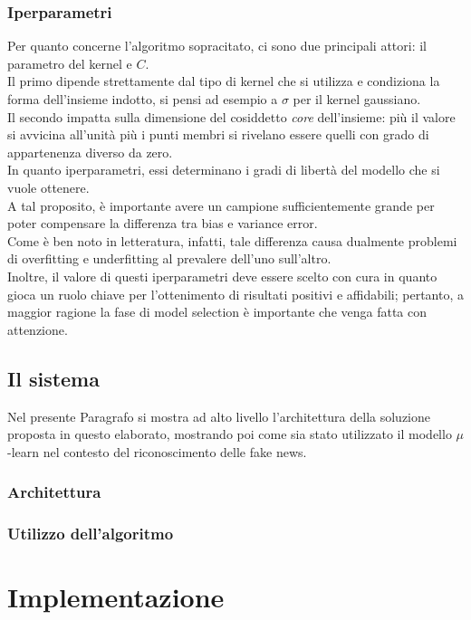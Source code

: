 \documentclass[12pt]{report}
\theoremstyle{definition}
\begin{document}
\subsection{Iperparametri}
Per quanto concerne l'algoritmo sopracitato, ci sono due principali attori: il parametro del kernel e $C$.
\\
Il primo dipende strettamente dal tipo di kernel che si utilizza e condiziona la forma dell'insieme indotto, si pensi ad esempio a $\sigma$ per il kernel gaussiano.
\\
Il secondo impatta sulla dimensione del cosiddetto \textit{core} dell'insieme: più il valore si avvicina all'unità più i punti membri si rivelano essere quelli con grado di appartenenza diverso da zero.
\\
In quanto iperparametri, essi determinano i gradi di libertà del modello che si vuole ottenere.
\\
A tal proposito, è importante avere un campione sufficientemente grande per poter compensare la differenza tra bias e variance error.
\\
Come è ben noto in letteratura, infatti, tale differenza causa dualmente problemi di overfitting e underfitting al prevalere dell'uno sull'altro.
\\
Inoltre, il valore di questi iperparametri deve essere scelto con cura in quanto gioca un ruolo chiave per l'ottenimento di risultati positivi e affidabili; pertanto, a maggior ragione la fase di model selection è importante che venga fatta con attenzione.

\section{Il sistema}
\label{sistema}
Nel presente Paragrafo si mostra ad alto livello l'architettura della soluzione proposta in questo elaborato, mostrando poi come sia stato utilizzato il modello $\mu$-learn nel contesto del riconoscimento delle fake news.
\subsection{Architettura}
\subsection{Utilizzo dell'algoritmo}

\chapter{Implementazione}
\label{Capitolo 3}
\onehalfspacing
\end{document}
